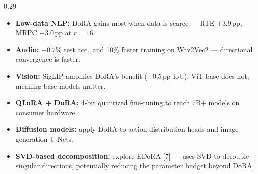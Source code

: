 \documentclass[final]{beamer}
\newcommand{\hl}[1]{\textcolor{CornellRed}{\textbf{#1}}}
\begin{document}
\begin{frame}[t]
\begin{columns}[T,totalwidth=\textwidth]
\begin{column}{0.29\textwidth}
			\begin{tcolorbox}[posterblock,title=Conclusions]
				{\small\begin{itemize}\setlength{\itemsep}{0.04cm}\setlength{\topsep}{0pt}
						\item \hl{Low-data NLP:} DoRA gains most when data is scarce —
						      RTE $+3.9$\,pp, MRPC $+3.0$\,pp at $r{=}16$.
						\item \hl{Audio:} $+0.7\%$ test acc.\ and 10\% faster training on
						      Wav2Vec2 — directional convergence is faster.
						\item \hl{Vision:} SigLIP amplifies DoRA's benefit ($+0.5$\,pp IoU);
						      ViT-base does not, meaning base models matter.
					\end{itemize}}
			\end{tcolorbox}

			\begin{tcolorbox}[posterblock,title=Future Work]
				{\small\begin{itemize}\setlength{\itemsep}{0.03cm}\setlength{\topsep}{0pt}
						\item \hl{QLoRA + DoRA:} 4-bit quantized fine-tuning to reach 7B+ models on consumer hardware.
						\item \hl{Diffusion models:} apply DoRA to action-distribution heads and image-generation U-Nets.
						\item \hl{SVD-based decomposition:} explore EDoRA [7] — uses SVD to decouple singular directions, potentially reducing the parameter budget beyond DoRA.
					\end{itemize}}
			\end{tcolorbox}


		\end{column}

	\end{columns}

\end{frame}
\end{document}
